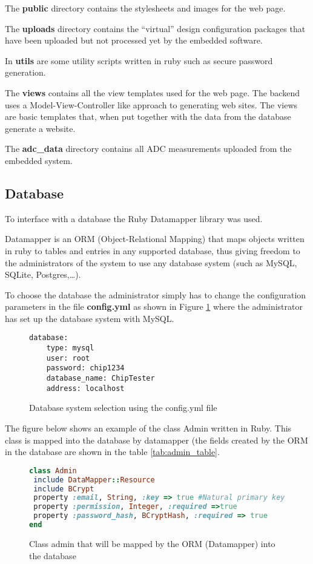 The {\bf public} directory contains the stylesheets and images for the web page.

The {\bf uploads} directory contains the ``virtual'' design configuration packages
that have been uploaded but not processed yet by the embedded software.

In {\bf utils} are some utility scripts written in ruby such as secure password generation.

The {\bf views} contains all the view templates used for the web page. The backend
uses a Model-View-Controller like approach to generating web sites. The views
are basic templates that, when put together with the data from the database generate
a website.

The {\bf adc\_data} directory contains all ADC measurements uploaded from the embedded system.



\subsection{Database}
To interface with a database the Ruby Datamapper library was used.

Datamapper is an ORM (Object-Relational Mapping) that maps objects written in ruby
to tables and entries in any supported database, thus giving freedom to the administrators
of the system to use any database system (such as MySQL, SQLite, Postgres,\ldots).

To choose the database the administrator simply has to change the configuration parameters
in the file {\bf config.yml} as shown in Figure \ref{fig:database_config} where the administrator
has set up the database system with MySQL.

\begin{figure}[htb]
\lstset{basicstyle=\scriptsize\ttfamily}
\begin{lstlisting}
database:
    type: mysql
    user: root
    password: chip1234
    database_name: ChipTester
    address: localhost
\end{lstlisting}
\caption{Database system selection using the config.yml file}
\label{fig:database_config}
\end{figure}

The figure below shows an example of the class Admin written in Ruby. This class is
mapped into the database by datamapper (the fields created by the ORM in the
database are shown in the table \ref{tab:admin_table}.
\begin{figure}[htb]
\begin{lstlisting}[language=Ruby]
class Admin
 include DataMapper::Resource
 include BCrypt
 property :email, String, :key => true #Natural primary key
 property :permission, Integer, :required =>true
 property :password_hash, BCryptHash, :required => true
end
\end{lstlisting}
\caption{Class admin that will be mapped by the ORM (Datamapper) into the database}
\label{fig:admin_orm}
\end{figure}

